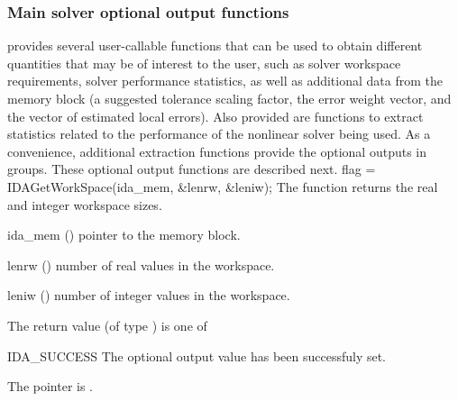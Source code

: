 \subsubsection{Main solver optional output functions}
{\ida} provides several user-callable functions that can be used to obtain
different quantities that may be of interest to the user, such as solver workspace
requirements, solver performance statistics, as well as additional data from
the {\ida} memory block (a suggested tolerance scaling factor, the error weight
vector, and the vector of estimated local errors). Also provided are functions to
extract statistics related to the performance of the {\ida} nonlinear solver
being used. As a convenience, additional extraction functions provide the optional 
outputs in groups.
These optional output functions are described next.
{
  flag = IDAGetWorkSpace(ida\_mem, \&lenrw, \&leniw);
}
{
  The function  returns the
  {\ida} real and integer workspace sizes.
}
{
  \begin{args}
  \item[ida\_mem] ()
    pointer to the {\ida} memory block.
  \item[lenrw] ()
    number of real values in the {\ida} workspace.
  \item[leniw] ()
    number of integer values in the {\ida} workspace.
  \end{args}
}
{
  The return value  (of type ) is one of
  \begin{args}
  \item[IDA\_SUCCESS] 
    The optional output value has been successfuly set.
  \item[\Id{IDA\_MEM\_NULL}]
    The  pointer is .
  \end{args}
}
